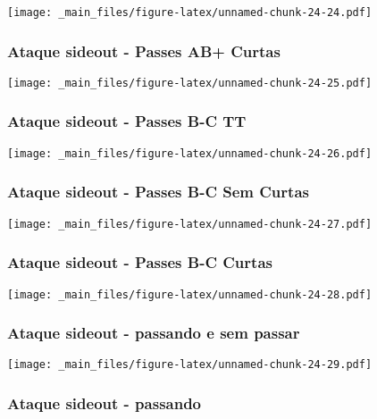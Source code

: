 \documentclass[
]{book}
\begin{document}
\texttt{[image: \_main\_files/figure-latex/unnamed-chunk-24-24.pdf]}

\subsubsection*{Ataque sideout - Passes AB+ Curtas}\label{ataque-sideout---passes-ab-curtas-1}

\texttt{[image: \_main\_files/figure-latex/unnamed-chunk-24-25.pdf]}

\subsubsection{Ataque sideout - Passes B-C TT}\label{ataque-sideout---passes-b-c-tt-1}

\texttt{[image: \_main\_files/figure-latex/unnamed-chunk-24-26.pdf]}

\subsubsection*{Ataque sideout - Passes B-C Sem Curtas}\label{ataque-sideout---passes-b-c-sem-curtas-1}

\texttt{[image: \_main\_files/figure-latex/unnamed-chunk-24-27.pdf]}

\subsubsection*{Ataque sideout - Passes B-C Curtas}\label{ataque-sideout---passes-b-c-curtas-1}

\texttt{[image: \_main\_files/figure-latex/unnamed-chunk-24-28.pdf]}

\subsubsection*{Ataque sideout - passando e sem passar}\label{ataque-sideout---passando-e-sem-passar-1}

\texttt{[image: \_main\_files/figure-latex/unnamed-chunk-24-29.pdf]}

\subsubsection*{Ataque sideout - passando}\label{ataque-sideout---passando-1}
\end{document}
